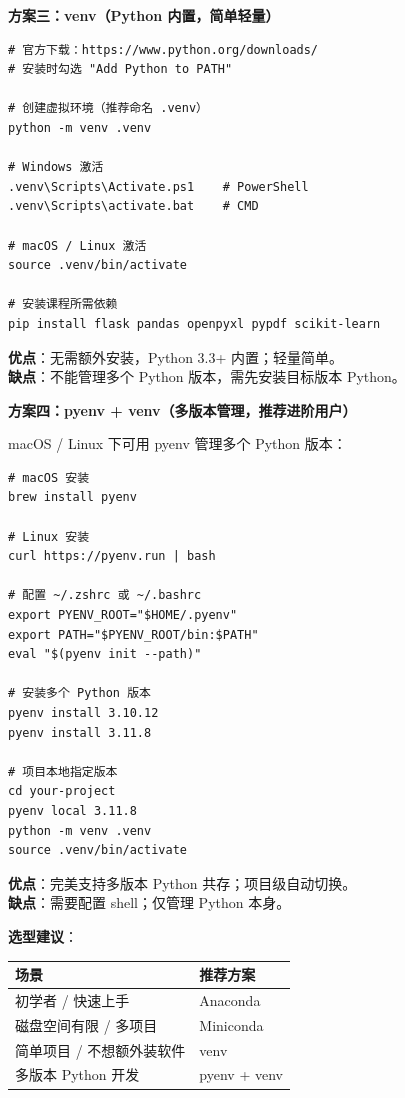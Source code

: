 \textbf{方案三：venv（Python 内置，简单轻量）}

\begin{lstlisting}[style=shell]
# 官方下载：https://www.python.org/downloads/
# 安装时勾选 "Add Python to PATH"

# 创建虚拟环境（推荐命名 .venv）
python -m venv .venv

# Windows 激活
.venv\Scripts\Activate.ps1    # PowerShell
.venv\Scripts\activate.bat    # CMD

# macOS / Linux 激活
source .venv/bin/activate

# 安装课程所需依赖
pip install flask pandas openpyxl pypdf scikit-learn
\end{lstlisting}

\textbf{优点}：无需额外安装，Python 3.3+ 内置；轻量简单。\\
\textbf{缺点}：不能管理多个 Python 版本，需先安装目标版本 Python。

\textbf{方案四：pyenv + venv（多版本管理，推荐进阶用户）}

macOS / Linux 下可用 pyenv 管理多个 Python 版本：

\begin{lstlisting}[style=shell]
# macOS 安装
brew install pyenv

# Linux 安装
curl https://pyenv.run | bash

# 配置 ~/.zshrc 或 ~/.bashrc
export PYENV_ROOT="$HOME/.pyenv"
export PATH="$PYENV_ROOT/bin:$PATH"
eval "$(pyenv init --path)"

# 安装多个 Python 版本
pyenv install 3.10.12
pyenv install 3.11.8

# 项目本地指定版本
cd your-project
pyenv local 3.11.8
python -m venv .venv
source .venv/bin/activate
\end{lstlisting}

\textbf{优点}：完美支持多版本 Python 共存；项目级自动切换。\\
\textbf{缺点}：需要配置 shell；仅管理 Python 本身。

\textbf{选型建议}：

\begin{table}[H]
\centering
\begin{tabular}{ll}
\toprule
\textbf{场景} & \textbf{推荐方案} \\
\midrule
初学者 / 快速上手 & Anaconda \\
磁盘空间有限 / 多项目 & Miniconda \\
简单项目 / 不想额外装软件 & venv \\
多版本 Python 开发 & pyenv + venv \\
\bottomrule
\end{tabular}
\end{table}

